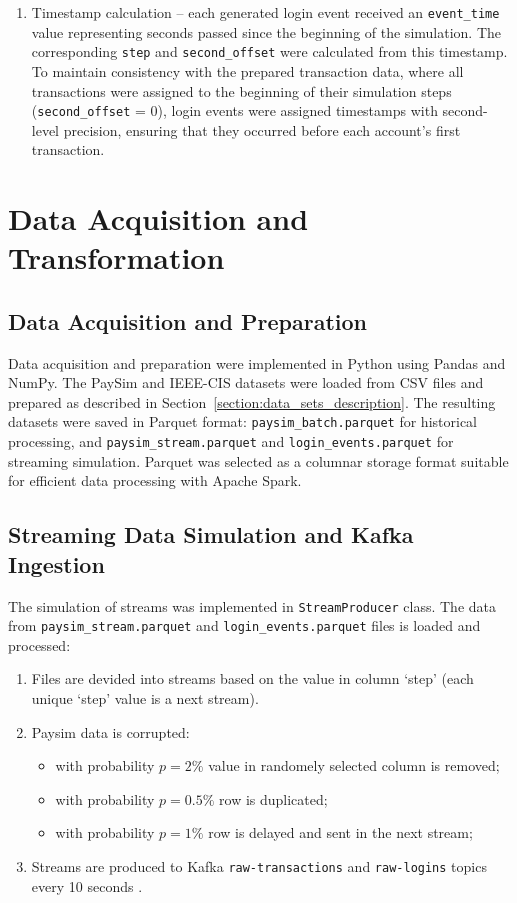 \documentclass[titlepage]{article}
\begin{document}
\begin{enumerate}
    \item Timestamp calculation -- each generated login event received an \texttt{event\_time} value representing seconds passed since the beginning of the simulation. The corresponding \texttt{step} and \texttt{second\_offset} were calculated from this timestamp. To maintain consistency with the prepared transaction data, where all transactions were assigned to the beginning of their simulation steps (\texttt{second\_offset} = 0), login events were assigned timestamps with second-level precision, ensuring that they occurred before each account's first transaction.
\end{enumerate}

\section{Data Acquisition and Transformation}
\subsection{Data Acquisition and Preparation}
Data acquisition and preparation were implemented in Python using Pandas and NumPy. The PaySim and IEEE-CIS datasets were loaded from CSV files and prepared as described in Section~\ref{section:data_sets_description}. The resulting datasets were saved in Parquet format: \texttt{paysim\_batch.parquet} for historical processing, and \texttt{paysim\_stream.parquet} and \texttt{login\_events.parquet} for streaming simulation. Parquet was selected as a columnar storage format suitable for efficient data processing with Apache Spark.

\subsection{Streaming Data Simulation and Kafka Ingestion}\label{sec:stream-sim}
The simulation of streams was implemented in \texttt{StreamProducer} class. The data from \texttt{paysim\_stream.parquet} and \texttt{login\_events.parquet} files is loaded and processed:
\begin{enumerate}
    \item Files are devided into streams based on the value in column `step' (each unique `step' value is a next stream).
    \item Paysim data is corrupted:
    \begin{itemize}
        \item with probability $p = 2\%$ value in randomely selected column is removed;
        \item with probability $p = 0.5\%$ row is duplicated;
        \item with probability $p = 1\%$ row is delayed and sent in the next stream;
    \end{itemize}
    \item Streams are produced to Kafka \texttt{raw-transactions} and \texttt{raw-logins} topics every 10 seconds .
\end{enumerate}
\end{document}
